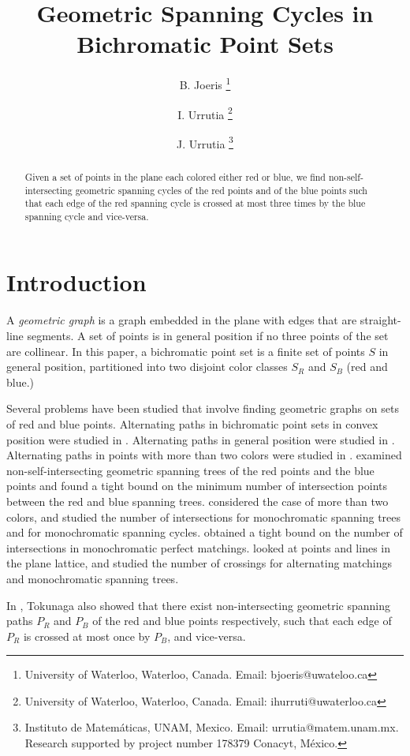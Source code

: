 \documentclass[12pt]{article}
\title{Geometric Spanning Cycles in Bichromatic Point Sets}
\author{B. Joeris \thanks{University of Waterloo, Waterloo, Canada. Email:
bjoeris@uwateloo.ca}
\and I. Urrutia \thanks{University of Waterloo, Waterloo, Canada. Email:
ihurruti@uwaterloo.ca} \and J. Urrutia \thanks{Instituto de Matem{\'a}ticas, UNAM,
Mexico.
Email:
urrutia@matem.unam.mx. Research supported by project number 178379 Conacyt, M{\'e}xico.}}
\date{}
\theoremstyle{definition}
\begin{document}
\maketitle

\begin{abstract}
Given a set of points in the plane each colored either red or blue, we find
non-self-intersecting geometric spanning cycles of the red points and of the
blue points such that each edge of the red spanning cycle is crossed at most
three times by the blue spanning cycle and vice-versa.
\end{abstract}

\section{Introduction}
A \emph{geometric graph} is a graph embedded in the plane
with edges that are straight-line segments. A set of points is in general position if no three points of the set are collinear.
In this paper, a bichromatic point set is a finite set of points $S$ in general position, partitioned into two disjoint color classes $S_R$ and $S_B$ (red and blue.) 


Several problems have been studied that involve finding geometric graphs on sets
of red and blue points. 
Alternating paths in bichromatic point sets in convex position were studied in
\cite{akiyama1990simple}. Alternating paths in general position were
studied in \cite{abellanas1999bipartite}.
Alternating paths in points with more
than two colors were studied in \cite{merino2006length}.
\cite{tokunaga1996intersection} examined non-self-intersecting geometric spanning trees of the red points and the blue
points and found a tight bound on the minimum number of intersection points
between the red and blue spanning trees.
\cite{Kano2005301} considered the case of more than two colors, and studied the
 number of intersections for monochromatic spanning trees and for
monochromatic spanning cycles.
\cite{merino2005intersection} obtained a tight bound on the number of
intersections in monochromatic perfect matchings.
\cite{kano2013discrete} looked at points and lines in the plane lattice, and
studied the number of crossings for alternating matchings and monochromatic
spanning trees.



In \cite{tokunaga1996intersection}, Tokunaga also showed that there exist
non-intersecting geometric spanning paths $P_R$ and $P_B$ of the red and blue points respectively, such that each
edge of $P_R$ is crossed at most once by $P_B$, and vice-versa. 
\end{document}
